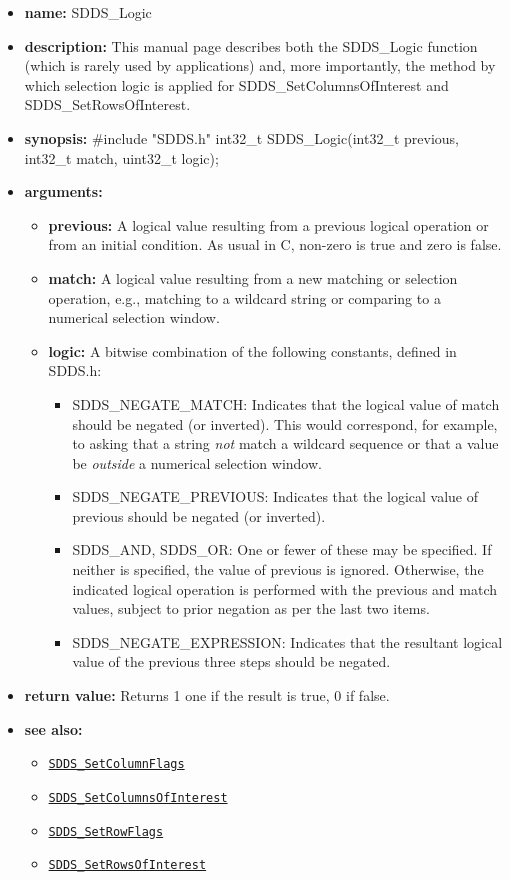 \documentclass[11pt]{article}
\newcommand{\progref}[1]{\hyperref[SDDS_#1]{\tt SDDS\_#1}}
\begin{document}
\begin{itemize}
\item {\bf name:}\newline
SDDS\_Logic
\item {\bf description:}\newline
This manual page describes both the SDDS\_Logic function (which is rarely used by applications) and, more importantly, the method by which selection logic is applied for SDDS\_SetColumnsOfInterest and SDDS\_SetRowsOfInterest.
\item {\bf synopsis:} \#include "SDDS.h"\newline
int32\_t SDDS\_Logic(int32\_t previous, int32\_t match, uint32\_t logic);
\item {\bf arguments:}
\begin{itemize}
\item {\bf previous:} A logical value resulting from a previous logical operation or from an initial condition. As usual in C, non-zero is true and zero is false.
\item {\bf match:} A logical value resulting from a new matching or selection operation, e.g., matching to a wildcard string or comparing to a numerical selection window.
\item {\bf logic:} A bitwise combination of the following constants, defined in  SDDS.h:
\begin{itemize}
\item SDDS\_NEGATE\_MATCH: Indicates that the logical value of  match should be negated (or inverted). This would correspond, for example, to asking that a string {\em not} match a wildcard sequence or that a value be {\em outside} a numerical selection window.
\item SDDS\_NEGATE\_PREVIOUS: Indicates that the logical value of  previous should be negated (or inverted).
\item SDDS\_AND, SDDS\_OR: One or fewer of these may be specified. If neither is specified, the value of  previous is ignored. Otherwise, the indicated logical operation is performed with the  previous and  match values, subject to prior negation as per the last two items.
\item SDDS\_NEGATE\_EXPRESSION: Indicates that the resultant logical value of the previous three steps should be negated.
\end{itemize}
\end{itemize}
\item {\bf return value:}\newline
Returns 1 one if the result is true, 0 if false.
\item {\bf see also:}
\begin{itemize}
\item \progref{SetColumnFlags}
\item \progref{SetColumnsOfInterest}
\item \progref{SetRowFlags}
\item \progref{SetRowsOfInterest}
\end{itemize}
\end{itemize}
\end{document}
